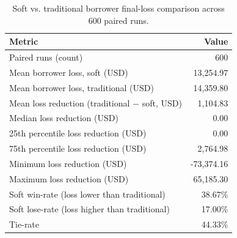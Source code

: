 \begin{table}[h!]
\centering
\caption{Soft vs. traditional borrower final-loss comparison across 600 paired runs.}
\label{tab:soft_vs_traditional_borrower_loss}
\begin{tabular}{@{}lr@{}}
\toprule
Metric & Value \\
\midrule
Paired runs (count) & 600 \\
Mean borrower loss, soft (USD) & 13,254.97 \\
Mean borrower loss, traditional (USD) & 14,359.80 \\
Mean loss reduction (traditional $-$ soft, USD) & 1,104.83 \\
Median loss reduction (USD) & 0.00 \\
25th percentile loss reduction (USD) & 0.00 \\
75th percentile loss reduction (USD) & 2,764.98 \\
Minimum loss reduction (USD) & -73,374.16 \\
Maximum loss reduction (USD) & 65,185.30 \\
Soft win-rate (loss lower than traditional) & 38.67\% \\
Soft lose-rate (loss higher than traditional) & 17.00\% \\
Tie-rate & 44.33\% \\
\bottomrule
\end{tabular}
\end{table}

